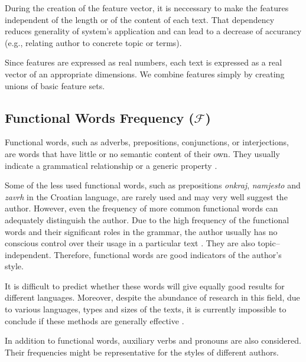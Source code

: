 \documentclass{llncs}
\begin{document}
During the creation of the feature vector, it is neccessary to make the
features independent of the length or of the content of each text. That
dependency reduces generality of system's application and can lead to a decrease of accurancy
(e.g., relating author to concrete topic or terms).

Since features are expressed as real numbers, each text is expressed as a real
vector of an appropriate dimensions. We combine features simply by creating unions of basic feature sets.


\subsection{Functional Words Frequency ($\mathcal{F}$)}
\label{sec:funkcijske-rijeci}
Functional words, such as adverbs, prepositions, conjunctions, or interjections,
are words that have little or no semantic content of their
own. They usually indicate a grammatical relationship or a generic property
\cite{zhao2005effective}.

Some of the less used functional words, such as prepositions \emph{onkraj},
\emph{namjesto} and \emph{zavrh} in the Croatian language, are rarely used and may very well suggest the
author. However, even the frequency of more common functional words can adequately distinguish the author. 
Due to the high frequency of the functional words and their significant roles in the grammar, the author 
usually has no conscious control over their usage in a particular text
\cite{argamon2005measuring}. They are also topic--independent.
Therefore, functional words are good indicators of the author's style.

It is difficult to predict whether these words will give equally good
results for different languages. Moreover, despite the abundance of research in this
field, due to various languages, types and sizes of the texts, it is
currently impossible to conclude if these methods are generally effective \cite{zhao2005effective}.

In addition to functional words, auxiliary verbs and pronouns are also considered.
Their frequencies might be representative for the styles of different authors.
\end{document}
